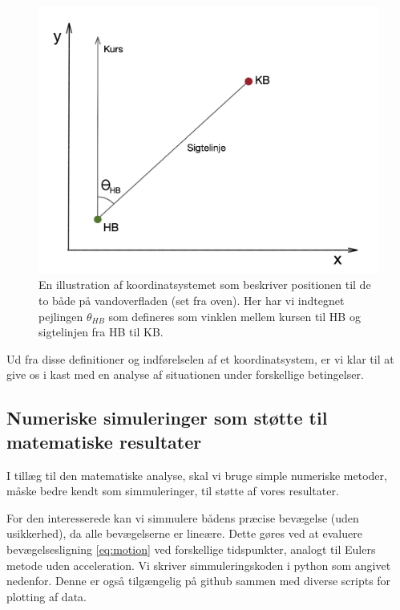 \documentclass[%
 reprint,
nofootinbib,
aps,
]{revtex4-1}
\begin{document}
\begin{figure}[H]
  \includegraphics[width=\linewidth]{figures/metode_tegning.png}
  \caption{En illustration af koordinatsystemet som beskriver positionen til de to både på vandoverfladen (set fra oven). Her har vi indtegnet pejlingen $\theta_{HB}$ som defineres som vinklen mellem kursen til HB og sigtelinjen fra HB til KB.}
  \label{fig:metode_tegning}
\end{figure}
Ud fra disse definitioner og indførelselen af et koordinatsystem, er vi klar til at give os i kast med en analyse af situationen under forskellige betingelser.

\subsection{Numeriske simuleringer som støtte til matematiske resultater}\label{sec:numerical_method}
I tillæg til den matematiske analyse, skal vi bruge simple numeriske metoder, måske bedre kendt som simmuleringer, til støtte af vores resultater. \par
For den interesserede kan vi simmulere bådens præcise bevægelse (uden usikkerhed), da alle bevægelserne er lineære. Dette gøres ved at evaluere bevægelsesligning \ref{eq:motion} ved forskellige tidspunkter, analogt til Eulers metode uden acceleration. Vi skriver simmuleringskoden i python som angivet nedenfor. Denne er også tilgængelig på github \cite{github} sammen med diverse scripts for plotting af data.
\end{document}
